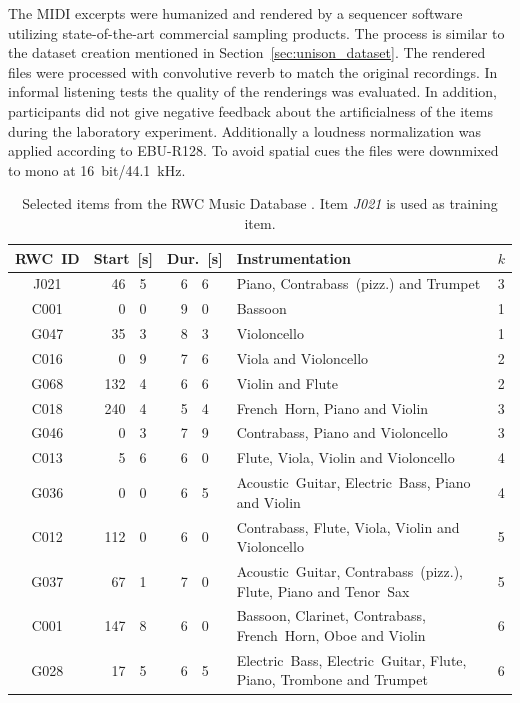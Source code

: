 \par
The MIDI excerpts were humanized and rendered by a sequencer software utilizing state-of-the-art commercial sampling products.
The process is similar to the dataset creation mentioned in Section~\ref{sec:unison_dataset}.
The rendered files were processed with convolutive reverb to match the original recordings. 
In informal listening tests the quality of the renderings was evaluated. 
In addition, participants did not give negative feedback about the artificialness of the items during the laboratory experiment. Additionally a loudness normalization was applied according to EBU-R128\cite{EBU2011}. To avoid spatial cues the files were downmixed to mono at 16~bit/44.1~kHz.

\begin{table}[htb]
\center
\scriptsize
\begin{tabular}{cr@{.}lr@{.}lp{6cm}c}
\toprule[1.5pt]
RWC~ID & \multicolumn{2}{c}{Start~[s]} & \multicolumn{2}{c}{Dur.~[s]} & Instrumentation & \(k\)\\
\midrule
J021 & 46 & 5 & 6 & 6 & Piano, Contrabass~(pizz.) and Trumpet & 3\\
\hline
C001 & 0&0 & 9&0 & Bassoon & 1  \\
G047 & 35&3 & 8&3 & Violoncello & 1 \\
\hline
C016 & 0&9 & 7&6 & Viola and Violoncello & 2\\
G068 & 132&4 & 6&6 & Violin and Flute &  2\\
\hline
C018 & 240&4 & 5&4 & French~Horn, Piano and Violin & 3\\
G046 & 0&3 & 7&9 & Contrabass, Piano and Violoncello & 3\\
\hline
C013 & 5&6 & 6&0 & Flute, Viola, Violin and Violoncello & 4\\
G036 & 0&0 & 6&5 &  Acoustic~Guitar, Electric~Bass, Piano  and Violin & 4\\
\hline
C012 & 112&0 & 6&0 & Contrabass, Flute, Viola, Violin and  Violoncello & 5\\
G037 & 67&1 & 7&0 & Acoustic~Guitar, Contrabass~(pizz.), Flute, Piano and Tenor~Sax & 5\\
\hline
C001 & 147&8 & 6&0 & Bassoon, Clarinet, Contrabass, French~Horn, Oboe and Violin & 6\\
G028 & 17&5 & 6&5 & Electric~Bass, Electric~Guitar, Flute, Piano, Trombone and Trumpet & 6\\
\bottomrule[1.5pt]
\end{tabular}
\caption{Selected items from the RWC Music Database \cite{rwc}. Item \emph{J021} is used as training item.}
\label{tab:items}
\end{table}


